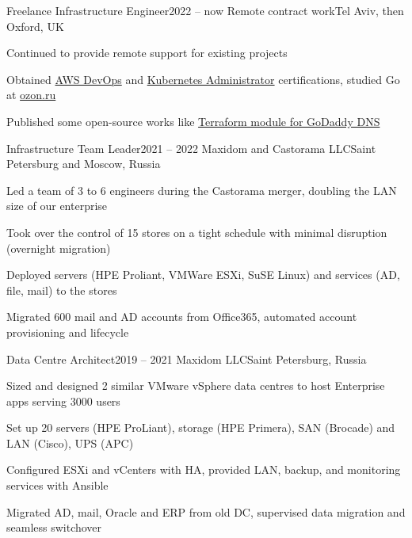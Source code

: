 

\expSubHeading
  {Freelance Infrastructure Engineer}{2022 -- now}
  {Remote contract work}{Tel Aviv, then Oxford, UK}
\begin{zitemize}
\item Continued to provide remote support for existing projects
\item Obtained \href{https://www.credly.com/badges/5b2e59d4-7b92-4512-a27f-3766fd520ad6}{AWS DevOps} and \href{https://www.credly.com/badges/35cd73fb-d95d-4f98-b7ce-caa6664475dc}{Kubernetes Administrator} certifications, studied Go at \href{https://route256.ozon.ru/}{ozon.ru}
\item Published some open-source works like \href{https://github.com/veksh/terraform-provider-godaddy-dns}{Terraform module for GoDaddy DNS}
\end{zitemize}

\expSubHeading
  {Infrastructure Team Leader}{2021 -- 2022}
  {Maxidom and Castorama LLC}{Saint Petersburg and Moscow, Russia}
\begin{zitemize}
\item Led a team of 3 to 6 engineers during the Castorama merger, doubling the LAN size of our enterprise
\item Took over the control of 15 stores on a tight schedule with minimal disruption (overnight migration)
\item Deployed servers (HPE Proliant, VMWare ESXi, SuSE Linux) and services (AD, file, mail) to the stores
\item Migrated 600 mail and AD accounts from Office365, automated account provisioning and lifecycle
\end{zitemize}

\expSubHeading
  {Data Centre Architect}{2019 -- 2021}
  {Maxidom LLC}{Saint Petersburg, Russia}
\begin{zitemize}
\item Sized and designed 2 similar VMware vSphere data centres to host Enterprise apps serving 3000 users
\item Set up 20 servers (HPE ProLiant), storage (HPE Primera), SAN (Brocade) and LAN (Cisco), UPS (APC)
\item Configured ESXi and vCenters with HA, provided LAN, backup, and monitoring services with Ansible
\item Migrated AD, mail, Oracle and ERP from old DC, supervised data migration and seamless switchover
\end{zitemize}

